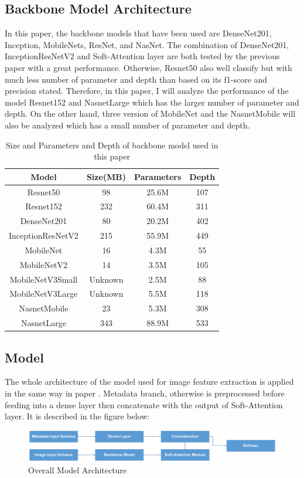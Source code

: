 \subsection{Backbone Model Architecture}
In this paper, the backbone models that have been used are DenseNet201\cite{06993}, Inception\cite{00567}, MobileNets\cite{04861}\cite{04381}\cite{02244}, ResNet\cite{03385}\cite{05027}, and NasNet\cite{07012}. The combination of DenseNet201, InceptionResNetV2 and Soft-Attention layer are both tested by the previous paper\cite{03358} with a great performance. Otherwise, Resnet50 also well classify but with much less number of parameter and depth than based on its f1-score and precision stated. Therefore, in this paper, I will analyze the performance of the model Resnet152 and NasnetLarge which has the larger number of parameter and depth. On the other hand, three version of MobileNet and the NasnetMobile will also be analyzed which has a small number of parameter and depth.  
\begin{table}
	\centering
	\begin{tabular}{|c | c c c|} 
		\hline
		Model & Size(MB) & Parameters & Depth \\ 
		\hline
		Resnet50 & 98 & 25.6M & 107 \\ 
		\hline
		Resnet152 & 232 & 60.4M & 311 \\ 
		\hline
		DenseNet201 & 80 & 20.2M & 402 \\
		\hline
		InceptionResNetV2 & 215 & 55.9M & 449 \\
		\hline
		MobileNet & 16 & 4.3M & 55 \\ 
		\hline
		MobileNetV2 & 14 & 3.5M & 105 \\ 
		\hline
		MobileNetV3Small & Unknown & 2.5M & 88 \\ 
		\hline
		MobileNetV3Large & Unknown & 5.5M & 118 \\
		\hline
		NasnetMobile & 23 & 5.3M & 308 \\
		\hline
		NasnetLarge & 343 & 88.9M & 533 \\ 
		\hline
	\end{tabular}
\caption{Size and Parameters and Depth of backbone model used in this paper}
\label{table:2}
\end{table}

\subsection{Model}
The whole architecture of the model used for image feature extraction is applied in the same way in paper \cite{03358}. Metadata branch, otherwise is preprocessed before feeding into a dense layer then concatenate with the output of Soft-Attention layer. It is described in the figure below:
\begin{figure}[h]
	\centering
	\includegraphics[width=1\linewidth]{Diagram/MainModel}
	\caption{Overall Model Architecture}
	\label{fig:mainmodel}
\end{figure}
